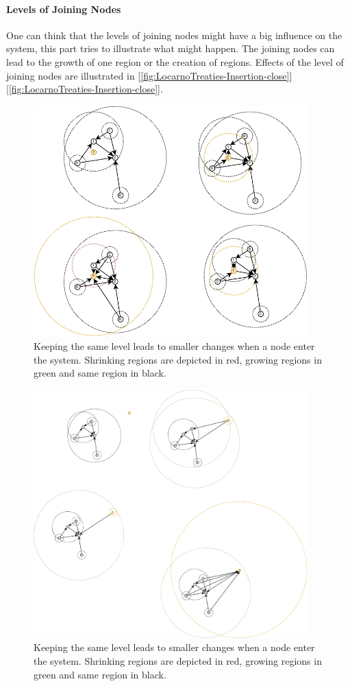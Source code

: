 \documentclass[a4paper,11pt,oneside]{report}
\begin{document}
\paragraph{Levels of Joining Nodes}
One can think that the levels of joining nodes might have a big influence on the
system, this part tries to illustrate what might happen. The joining nodes can
lead to the growth of one region or the creation
of regions. Effects of the level of joining nodes are illustrated in
[\autoref{fig:LocarnoTreaties-Insertion-close}][\autoref{fig:LocarnoTreaties-Insertion-close}].

\begin{figure}[!h] 
\centering
\includegraphics[width=300pt]{figures/LocarnoTreaties-Insertion-close}
\caption{Keeping the same level leads to smaller changes when a node enter the
  system. Shrinking regions are depicted in red, growing regions in green and
  same region in black.} \label{fig:LocarnoTreaties-Insertion-close}
\end{figure}

\begin{figure}[!h] 
\centering
\includegraphics[width=300pt]{figures/LocarnoTreaties-Insertion-far}
\caption{Keeping the same level leads to smaller changes when a node enter the
  system. Shrinking regions are depicted in red, growing regions in green and
  same region in black.} \label{fig:LocarnoTreaties-Insertion-far}
\end{figure}
\end{document}
